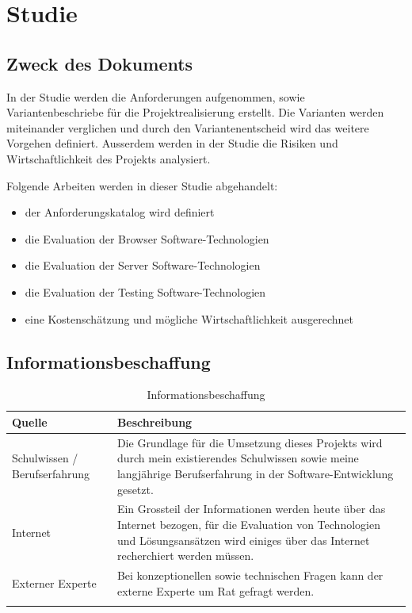 \chapter{Studie}

\label{AppendixStudie}

\section{Zweck des Dokuments}\label{StudieZweck}

In der Studie werden die Anforderungen aufgenommen, sowie Variantenbeschriebe
für die Projektrealisierung erstellt. Die Varianten werden miteinander
verglichen und durch den Variantenentscheid wird das weitere
Vorgehen definiert.
Ausserdem werden in der Studie die Risiken und Wirtschaftlichkeit des Projekts
analysiert.

Folgende Arbeiten werden in dieser Studie abgehandelt:

\begin{itemize}
  \tightlist
  \item der Anforderungskatalog wird definiert
  \item die Evaluation der Browser Software-Technologien
  \item die Evaluation der Server Software-Technologien
  \item die Evaluation der Testing Software-Technologien
  \item eine Kostenschätzung und mögliche Wirtschaftlichkeit ausgerechnet
\end{itemize}


\section{Informationsbeschaffung}\label{informationsbeschaffung}

\begin{longtable}[]{@{}lp{10cm}@{}}
  \toprule
  Quelle                        & Beschreibung\tabularnewline
  \toprule
  Schulwissen / Berufserfahrung & Die Grundlage für die Umsetzung dieses Projekts wird durch mein existierendes Schulwissen sowie meine langjährige Berufserfahrung in der Software-Entwicklung gesetzt.\tabularnewline
  \midrule
  Internet                      & Ein Grossteil der Informationen werden heute über das Internet bezogen, für die Evaluation von Technologien und Lösungsansätzen wird einiges über das Internet recherchiert werden müssen.\tabularnewline
  \midrule
  Externer Experte              & Bei konzeptionellen sowie technischen Fragen kann der externe Experte um Rat gefragt werden.\tabularnewline
  \bottomrule
  \caption{Informationsbeschaffung}
\end{longtable}

